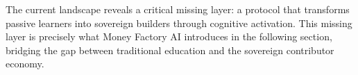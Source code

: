 The current landscape reveals a critical missing layer: a protocol that transforms passive learners into sovereign builders through cognitive activation. This missing layer is precisely what Money Factory AI introduces in the following section, bridging the gap between traditional education and the sovereign contributor economy.

\newpage 